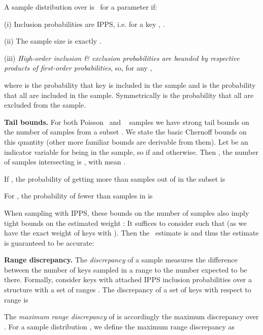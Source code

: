 \documentclass[11pt]{article}
\begin{document}
\noindent
A sample distribution over  is \varopt\ for a parameter  if:
 \begin{trivlist}
\item [(i)]
  Inclusion probabilities are IPPS, i.e. for a key ,
. 
\item [(ii)]
 The sample size is exactly . 
\item [(iii)] 
{\em High-order inclusion \& exclusion probabilities are bounded 
 by respective products of first-order probabilities}, so, 
for any , 

where  is the probability that key  is included
in the sample  and 
is the probability that all 
are included in the sample. Symmetrically
 is the probability 
that all  are excluded from the sample. 
 \end{trivlist}

\noindent
{\bf Tail bounds.}
  For both Poisson~\cite{Chernoff} and \varopt~\cite{PancSri:sicomp97,Sri01,GandhiKPS:jacm06,varopt_full:CDKLT10} samples we have
strong tail bounds on the number of samples  from a subset .
We state the basic Chernoff bounds on this quantity
(other more familiar bounds are derivable from them).
Let  be an indicator variable for  being in the sample, so
 if  and  otherwise.
Then , the number of samples intersecting  is
, with mean 
  . 

If , 
the probability of getting more than  samples out of  
in the subset  is

For , the probability of fewer than 
samples in  is 

\noindent
When sampling with IPPS, 
these bounds on the number of samples also imply tight bounds
on the estimated weight : 
It suffices to consider  such that  
(as we have the exact weight of keys
with ).  
Then
the \HT\ estimate is
 and thus 
the estimate is guaranteed to be accurate:


\noindent
{\bf Range discrepancy.}
The {\em discrepancy} of a sample measures the difference between the
number of keys sampled in a range to the number expected to be there. 
Formally, consider keys with attached IPPS inclusion probabilities
 over a structure with a set of ranges . 
The discrepancy  of a set of keys  with respect to range  is

\smallskip
\centerline{}

\smallskip
The {\em maximum range discrepancy} of  is accordingly the maximum
discrepancy over .
For a sample distribution , we define the
maximum range discrepancy as


\smallskip
\centerline{}
\end{document}
